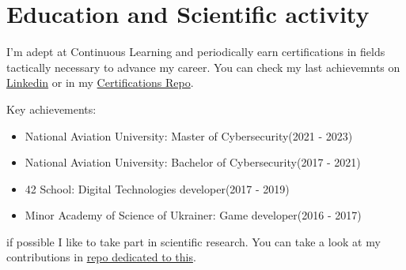 \section{Education and Scientific activity}

I'm adept at Continuous Learning and periodically earn certifications in fields
tactically necessary to advance my career. You can check my last achievemnts on
\href{https://www.linkedin.com/in/dkushchevskyi/}{Linkedin} or in my
\href{https://github.com/dkushche/Certifications}{Certifications Repo}.

\vspace{0.2in}

Key achievements:
\begin{itemize}
    \item National Aviation University: Master of Cybersecurity\hspace*{\fill}(2021 - 2023)
    \item National Aviation University: Bachelor of Cybersecurity\hspace*{\fill}(2017 - 2021)
    \item 42 School: Digital Technologies developer\hspace*{\fill}(2017 - 2019)
    \item Minor Academy of Science of Ukrainer: Game developer\hspace*{\fill}(2016 - 2017)
\end{itemize}

\vspace{0.2in}

if possible I like to take part in scientific research. You can take a look at my
contributions in \href{https://github.com/dkushche/Scientific_publications}{repo dedicated to this}.
